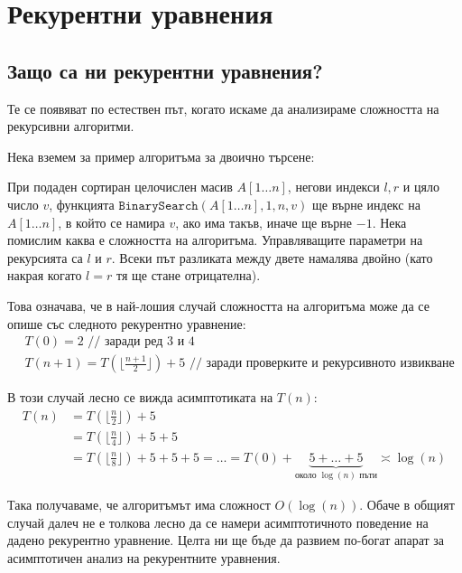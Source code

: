 \chapter{Рекурентни уравнения}

\section{Защо са ни рекурентни уравнения?}

Те се появяват по естествен път, когато искаме да анализираме сложността на рекурсивни алгоритми.

Нека вземем за пример алгоритъма за двоично търсене:


При подаден сортиран целочислен масив $A[1 \dots n]$, негови индекси $l, r$ и цяло число $v$, функцията $\mathtt{BinarySearch}(A[1 \dots n], 1, n, v)$ ще върне индекс на $A[1 \dots n]$, в който се намира $v$, ако има такъв, иначе ще върне $-1$.
Нека помислим каква е сложността на алгоритъма.
Управляващите параметри на рекурсията са $l$ и $r$.
Всеки път разликата между двете намалява двойно (като накрая когато $l = r$ тя ще стане отрицателна).

\newpage

Това означава, че в най-лошия случай сложността на алгоритъма може да се опише със следното рекурентно уравнение:
\begin{align*}
     & T(0) = 2 \text{ // заради ред } 3 \text{ и } 4                                                          \\
     & T(n + 1) = T(\lfloor \frac{n + 1}{2} \rfloor) + 5 \text{ // заради проверките и рекурсивното извикване}
\end{align*}

В този случай лесно се вижда асимптотиката на $T(n)$:
\begin{align*}
    T(n) & = T(\lfloor \frac{n}{2} \rfloor) + 5                                                                                                         \\
         & = T(\lfloor \frac{n}{4} \rfloor) + 5 + 5                                                                                                     \\
         & = T(\lfloor \frac{n}{8} \rfloor) + 5 + 5 + 5 = \dots = T(0) + \underbrace{5 + \dots + 5}_{\text{около } \log(n) \text{ пъти}} \asymp \log(n)
\end{align*}

Така получаваме, че алгоритъмът има сложност $O(\log(n))$.
Обаче в общият случай далеч не е толкова лесно да се намери асимптотичното поведение на дадено рекурентно уравнение.
Целта ни ще бъде да развием по-богат апарат за асимптотичен анализ на рекурентните уравнения.

